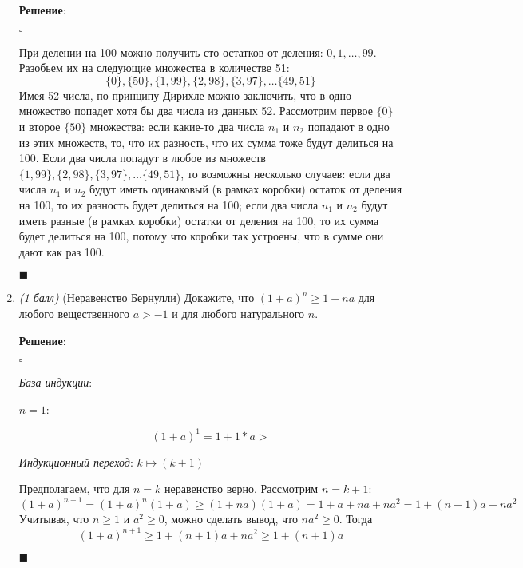 \documentclass{article}
\begin{document}
\begin{enumerate}
        \textbf{Решение}:

        $\square$

        При делении на 100 можно получить сто остатков от деления: $0, 1, \ldots, 99$. Разобьем их на следующие множества в количестве 51:
        $$\{0\}, \{50\}, \{1, 99\}, \{2, 98\}, \{3, 97\}, \ldots \{49, 51\}$$
        Имея 52 числа, по принципу Дирихле можно заключить, что в одно множество попадет хотя бы два числа из данных 52. Рассмотрим первое $\{0\}$ и второе $\{50\}$ множества: если какие-то два числа $n_1$ и $n_2$ попадают в одно из этих множеств, то, что их разность, что их сумма тоже будут делиться на 100. Если два числа попадут в любое из множеств $\{1, 99\}, \{2, 98\}, \{3, 97\}, \ldots \{49, 51\}$, то возможны несколько случаев: если два числа $n_1$ и $n_2$ будут иметь одинаковый (в рамках коробки) остаток от деления на 100, то их разность будет делиться на 100; если два числа $n_1$ и $n_2$ будут иметь разные (в рамках коробки) остатки от деления на 100, то их сумма будет делиться на 100, потому что коробки так устроены, что в сумме они дают как раз 100.
        \begin{flushright}
            $\blacksquare$
        \end{flushright}

        \item \textit{(1 балл)} (Неравенство Бернулли) Докажите, что $(1+a)^n\geq1+na$ для любого вещественного $a>-1$ и для любого натурального $n$.
        
        \textbf{Решение}:

        $\square$

        \textit{База индукции}:
        
        $n=1$: 

        $$(1+a)^1=1+1*a>$$

        \textit{Индукционный переход}: $k\mapsto(k+1)$

        Предполагаем, что для $n=k$ неравенство верно. Рассмотрим $n=k+1$:
        $$(1+a)^{n+1}=(1+a)^n(1+a)\geq(1+na)(1+a)=1+a+na+na^2=1+(n+1)a+na^2$$
        Учитывая, что $n\geq1$ и $a^2\geq0$, можно сделать вывод, что $na^2\geq0$. Тогда
        $$(1+a)^{n+1}\geq1+(n+1)a+na^2\geq1+(n+1)a$$

        \begin{flushright}
            $\blacksquare$
        \end{flushright}

    \end{enumerate}
\end{document}
